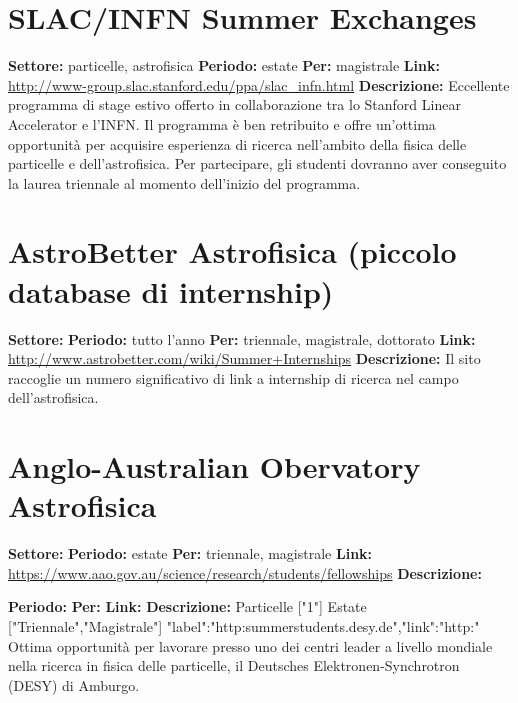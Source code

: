 \documentclass[a4paper,10pt]{article}
\begin{document}
{\section{SLAC/INFN Summer Exchanges}
\textbf{Settore:} particelle, astrofisica\newline
\textbf{Periodo:} estate \newline
\textbf{Per:} magistrale\newline
\textbf{Link:} \url{http://www-group.slac.stanford.edu/ppa/slac_infn.html} \newline
\textbf{Descrizione:} Eccellente programma di stage estivo offerto in collaborazione tra lo Stanford Linear Accelerator e l'INFN. Il programma è ben retribuito e offre un'ottima opportunità per acquisire esperienza di ricerca nell'ambito della fisica delle particelle e dell'astrofisica. Per partecipare, gli studenti dovranno aver conseguito la laurea triennale al momento dell'inizio del programma.	

\section{AstroBetter	Astrofisica (piccolo database di internship)}
\textbf{Settore:} \newline
\textbf{Periodo:} tutto l'anno\newline
\textbf{Per:} triennale, magistrale, dottorato\newline
\textbf{Link:} \url{http://www.astrobetter.com/wiki/Summer+Internships} \newline
\textbf{Descrizione:} Il sito raccoglie un numero significativo di link a internship di ricerca nel campo dell'astrofisica.	

\section{Anglo-Australian Obervatory Astrofisica}
\textbf{Settore:} \newline
\textbf{Periodo:} estate\newline
\textbf{Per:} triennale, magistrale\newline
\textbf{Link:} \url{https://www.aao.gov.au/science/research/students/fellowships} \newline
\textbf{Descrizione:} 	

\textbf{Periodo:} \newline
\textbf{Per:}\newline
\textbf{Link:} \url{} \newline
\textbf{Descrizione:}  	Particelle	["1"]	Estate	["Triennale","Magistrale"]	{"label":"http:\/\/summerstudents.desy.de\/","link":"http:\/\/"}	Ottima opportunità per lavorare presso uno dei centri leader a livello mondiale nella ricerca in fisica delle particelle, il Deutsches Elektronen-Synchrotron (DESY) di Amburgo.	

}
\end{document}
